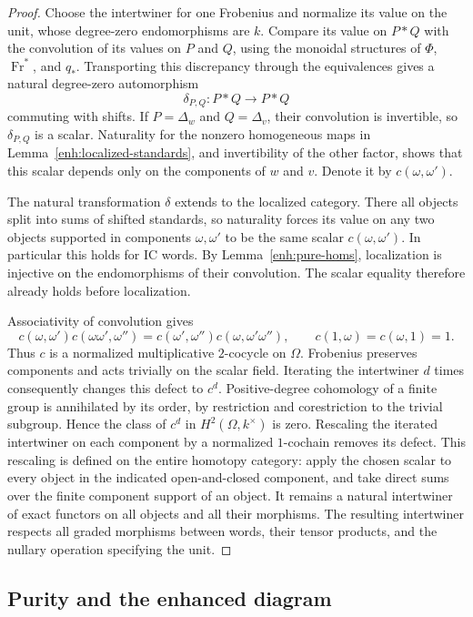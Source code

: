 \documentclass[11pt]{article}
\numberwithin{equation}{section}
\theoremstyle{definition}
\theoremstyle{remark}
\newcommand{\Fr}{\operatorname{Fr}}
\begin{document}
\begin{proof}
Choose the intertwiner for one Frobenius and normalize its value on
the unit, whose degree-zero endomorphisms are $k$.
Compare its value on $P*Q$ with the convolution of its values on
$P$ and $Q$, using the monoidal structures of $\Phi$, $\Fr^*$,
and $q_*$.  Transporting this discrepancy through the equivalences
gives a natural degree-zero automorphism
\[
 \delta_{P,Q}:P*Q\longrightarrow P*Q
\]
commuting with shifts.  If $P=\Delta_w$ and $Q=\Delta_v$, their
convolution is invertible, so $\delta_{P,Q}$ is a scalar.
Naturality for the nonzero homogeneous maps in
Lemma~\ref{enh:localized-standards}, and invertibility of the other
factor, shows that this scalar depends only on the components of
$w$ and $v$.  Denote it by $c(\omega,\omega')$.

The natural transformation $\delta$ extends to the localized
category.  There all objects split into sums of shifted standards,
so naturality forces its value on any two objects supported in
components $\omega,\omega'$ to be the same scalar
$c(\omega,\omega')$.  In particular this holds for IC words.
By Lemma~\ref{enh:pure-homs}, localization is injective on the
endomorphisms of their convolution.  The scalar equality therefore
already holds before localization.

Associativity of convolution gives
\[
 c(\omega,\omega')c(\omega\omega',\omega'')
 =c(\omega',\omega'')c(\omega,\omega'\omega''),
 \qquad
 c(1,\omega)=c(\omega,1)=1.
\]
Thus $c$ is a normalized multiplicative $2$-cocycle on $\Omega$.
Frobenius preserves components and acts trivially on the scalar
field.  Iterating the intertwiner $d$ times consequently changes
this defect to $c^d$.  Positive-degree cohomology of a finite group
is annihilated by its order, by restriction and corestriction to
the trivial subgroup.  Hence the class of $c^d$ in
$H^2(\Omega,k^\times)$ is zero.  Rescaling the iterated
intertwiner on each component by a normalized $1$-cochain removes
its defect.  This rescaling is defined on the entire homotopy
category: apply the chosen scalar to every object in the indicated
open-and-closed component, and take direct sums over the finite
component support of an object.  It remains a natural intertwiner
of exact functors on all objects and all their morphisms.
The resulting intertwiner respects all graded
morphisms between words, their tensor products, and the nullary
operation specifying the unit.
\end{proof}

\subsection{Purity and the enhanced diagram}
\end{document}
